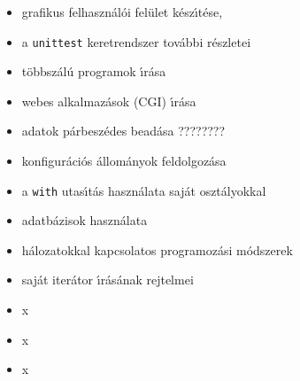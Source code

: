 \begin{itemize}
   \item{grafikus felhaszn\'al\'oi fel\"ulet k\'esz\'{\i}t\'ese,}
   \item{a {\tt unittest} keretrendszer tov\'abbi r\'eszletei}
   \item{t\"obbsz\'al\'u programok \'{\i}r\'asa}
   \item{webes alkalmaz\'asok (CGI) \'{\i}r\'asa} 
   \item{adatok p\'arbesz\'edes bead\'asa   ????????}
   \item{konfigur\'aci\'os \'allom\'anyok feldolgoz\'asa} 
   \item{a {\tt with} utas\'{\i}t\'as haszn\'alata saj\'at oszt\'alyokkal}
   \item{adatb\'azisok haszn\'alata}
   \item{h\'alozatokkal kapcsolatos programoz\'asi m\'odszerek}
   \item{saj\'at iter\'ator \'{\i}r\'as\'anak rejtelmei}
   \item{x}
   \item{x}
   \item{x}
\end{itemize}

\printindex


